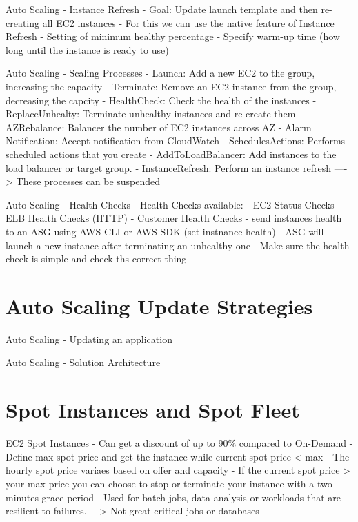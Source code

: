 \documentclass[11pt]{book}
\begin{document}
    Auto Scaling - Instance Refresh
    - Goal: Update launch template and then re-creating all EC2 instances
    - For this we can use the native feature of Instance Refresh
    - Setting of minimum healthy percentage
    - Specify warm-up time (how long until the instance is ready to use)

    Auto Scaling - Scaling Processes
    - Launch: Add a new EC2 to the group, increasing the capacity
    - Terminate: Remove an EC2 instance from the group, decreasing the capcity
    - HealthCheck: Check the health of the instances
    - ReplaceUnhealty: Terminate unhealthy instances and re-create them
    - AZRebalance: Balancer the number of EC2 instances across AZ
    - Alarm Notification: Accept notification from CloudWatch
    - SchedulesActions: Performs scheduled actions that you create
    - AddToLoadBalancer: Add instances to the load balancer or target group.
    - InstanceRefresh: Perform an instance refresh
    ----> These processes can be suspended

    Auto Scaling - Health Checks
    - Health Checks available:
        - EC2 Status Checks
        - ELB Health Checks (HTTP)
        - Customer Health Checks - send instances health to an ASG using AWS CLI or AWS SDK (set-instnance-health)
    - ASG will launch a new instance after terminating an unhealthy one
    - Make sure the health check is simple and check ths correct thing

    \section{Auto Scaling Update Strategies}
    Auto Scaling - Updating an application

    Auto Scaling - Solution Architecture


    \section{Spot Instances and Spot Fleet}

    EC2 Spot Instances
    - Can get a discount of up to 90\% compared to On-Demand
    - Define max spot price and get the instance while current spot price < max
    - The hourly spot price variaes based on offer and capacity
    - If the current spot price > your max price you can choose to stop or terminate your instance with a two minutes grace period
    - Used for batch jobs, data analysis or workloads that are resilient to failures.
    ---> Not great critical jobs or databases
\end{document}
